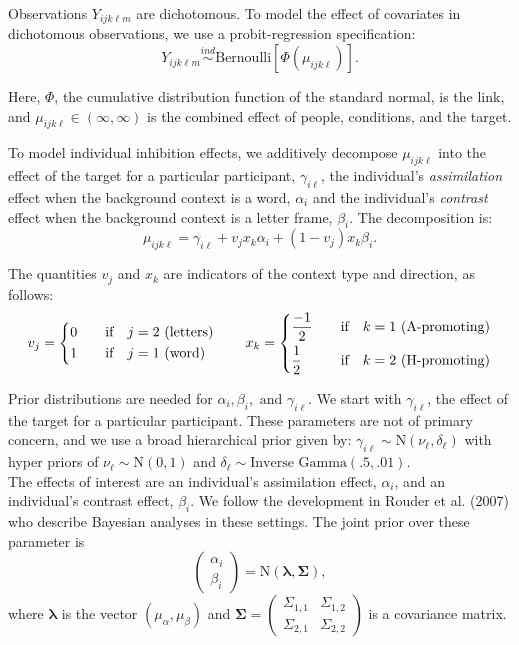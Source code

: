 \documentclass[english,man]{apa6}
\begin{document}
Observations \(Y_{ijk\ell m}\) are dichotomous. To model the effect of
covariates in dichotomous observations, we use a probit-regression
specification:
\[Y_{ijk\ell m} \stackrel{ind}{\sim} \text{Bernoulli}\left[\Phi(\mu_{ijk\ell})\right].\]

Here, \(\Phi\), the cumulative distribution function of the standard
normal, is the link, and \(\mu_{ijk\ell} \in (\infty,\infty)\) is the
combined effect of people, conditions, and the target.

To model individual inhibition effects, we additively decompose
\(\mu_{ijk\ell}\) into the effect of the target for a particular
participant, \(\gamma_{i\ell}\), the individual's \emph{assimilation}
effect when the background context is a word, \(\alpha_i\) and the
individual's \emph{contrast} effect when the background context is a
letter frame, \(\beta_i\). The decomposition is:
\[\mu_{ijk\ell}=\gamma_{i\ell}+v_jx_k\alpha_i+(1-v_j)x_k\beta_i.\]

The quantities \(v_j\) and \(x_k\) are indicators of the context type
and direction, as follows: \[ v_j=
  \begin{dcases}
      0 & \quad \text{if} \quad j =2  \text{ (letters)}\\
      1 & \quad \text{if} \quad j =1 \text{ (word)}
  \end{dcases}
  \qquad
  x_k=
  \begin{dcases}
      \frac{-1}{2} & \quad \text{if} \quad k =1  \text{ (A-promoting)}\\
      \frac{1}{2}  & \quad \text{if} \quad k =2 \text{ (H-promoting)}
  \end{dcases}
\]

Prior distributions are needed for
\(\alpha_i, \beta_i, \text{ and } \gamma_{i\ell}\). We start with
\(\gamma_{i\ell}\), the effect of the target for a particular
participant. These parameters are not of primary concern, and we use a
broad hierarchical prior given by:
\(\gamma_{i\ell} \sim \mbox{N}(\nu_\ell,\delta_\ell)\) with hyper priors
of \(\nu_{\ell} \sim \mbox{N}(0,1)\) and
\(\delta_{\ell} \sim \mbox{Inverse Gamma}(.5,.01)\).\\
The effects of interest are an individual's assimilation effect,
\(\alpha_i\), and an individual's contrast effect, \(\beta_i\). We
follow the development in Rouder et al. (2007) who describe Bayesian
analyses in these settings. The joint prior over these parameter is
\[\begin{pmatrix}
  \alpha_i\\
  \beta_i
\end{pmatrix} = \mbox{N}(\boldsymbol{\lambda},\boldsymbol{\Sigma}),\]
where \(\boldsymbol{\lambda}\) is the vector
\((\mu_{\alpha},\mu_{\beta})\) and
\(\boldsymbol{\Sigma}=\begin{pmatrix} \Sigma_{1,1} & \Sigma_{1,2} \\ \Sigma_{2,1} & \Sigma_{2,2} \end{pmatrix}\)
is a covariance matrix.
\end{document}

